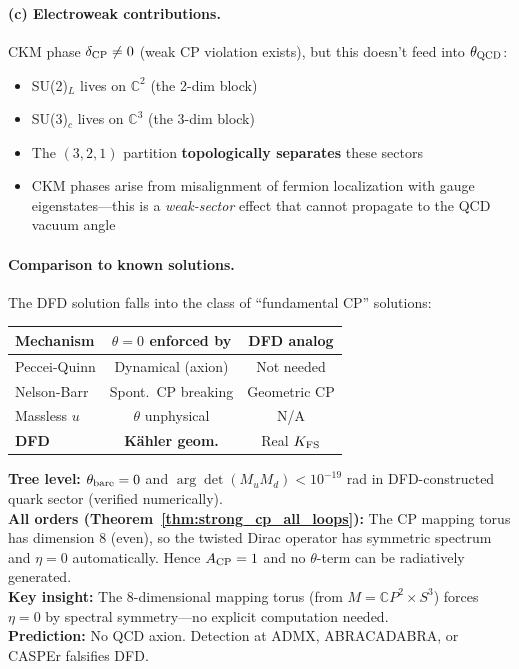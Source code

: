 \paragraph{(c) Electroweak contributions.}
CKM phase $\delta_{\rm CP} \neq 0$ (weak CP violation exists), but this doesn't feed into $\theta_{\rm QCD}$:
\begin{itemize}
\item SU(2)$_L$ lives on $\mathbb{C}^2$ (the 2-dim block)
\item SU(3)$_c$ lives on $\mathbb{C}^3$ (the 3-dim block)
\item The $(3,2,1)$ partition \textbf{topologically separates} these sectors
\item CKM phases arise from misalignment of fermion localization with gauge eigenstates---this is a \textit{weak-sector} effect that cannot propagate to the QCD vacuum angle
\end{itemize}

\paragraph{Comparison to known solutions.}
The DFD solution falls into the class of ``fundamental CP'' solutions:
\begin{center}
\renewcommand{\arraystretch}{1.2}
\scriptsize
\begin{tabular}{lcc}
\toprule
Mechanism & $\theta = 0$ enforced by & DFD analog \\
\midrule
Peccei-Quinn & Dynamical (axion) & Not needed \\
Nelson-Barr & Spont.\ CP breaking & Geometric CP \\
Massless $u$ & $\theta$ unphysical & N/A \\
\textbf{DFD} & \textbf{K\"ahler geom.} & Real $K_{\rm FS}$ \\
\bottomrule
\end{tabular}
\end{center}

\begin{tcolorbox}[colback=green!5!white, colframe=green!60!black, title=Strong CP: THEOREM-GRADE ALL-ORDERS CLOSURE]
\textbf{Tree level:} $\theta_{\rm bare} = 0$ and $\arg\det(M_u M_d) < 10^{-19}$ rad in DFD-constructed quark sector (verified numerically).\\[2pt]
\textbf{All orders (Theorem~\ref{thm:strong_cp_all_loops}):} The CP mapping torus has dimension 8 (even), so the twisted Dirac operator has symmetric spectrum and $\eta = 0$ automatically. Hence $A_{\rm CP} = 1$ and no $\theta$-term can be radiatively generated.\\[2pt]
\textbf{Key insight:} The 8-dimensional mapping torus (from $M = \mathbb{C}P^2 \times S^3$) forces $\eta = 0$ by spectral symmetry---no explicit computation needed.\\[2pt]
\textbf{Prediction:} No QCD axion. Detection at ADMX, ABRACADABRA, or CASPEr falsifies DFD.
\end{tcolorbox}

